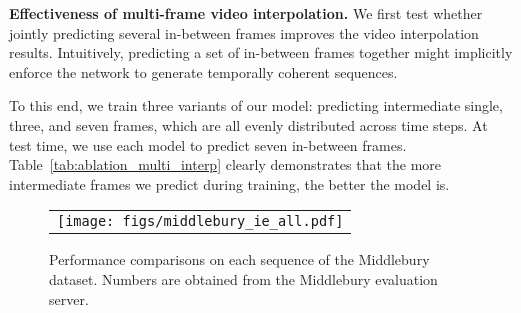 \documentclass[10pt,twocolumn,letterpaper]{article}
\makeatletter
\def\fps{-fps\@\xspace}
\makeatother
\begin{document}

\noindent\textbf{Effectiveness of multi-frame video interpolation.} %
We first test whether jointly predicting several in-between frames improves the video interpolation results. Intuitively, predicting a set of in-between frames together might implicitly enforce the network to generate temporally coherent sequences. 


To this end, we train three variants of our model: predicting intermediate single, three, and seven frames, which are all evenly distributed across time steps. At test time, we use each model to predict seven in-between frames. Table~\ref{tab:ablation_multi_interp} clearly demonstrates that the more intermediate frames we predict during training, the better the model is. 

\begin{figure}
\centering
\begin{tabular}{c}
\texttt{[image: figs/middlebury\_ie\_all.pdf]} \\
\end{tabular}
\caption{Performance comparisons on each sequence of the Middlebury dataset. Numbers are obtained from the Middlebury evaluation server.}
\label{fig:middlebury}
\end{figure}
\end{document}
